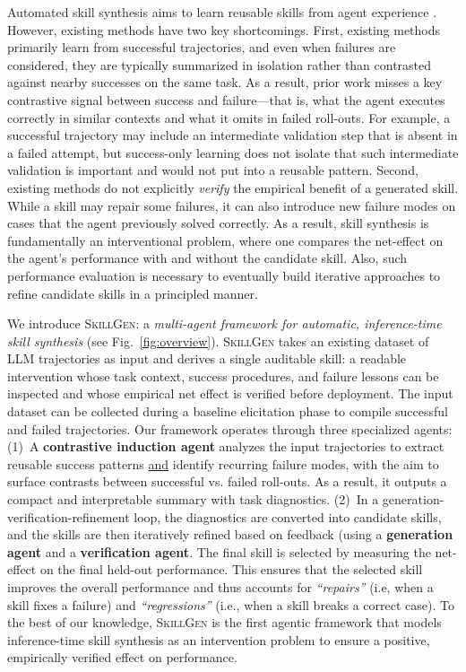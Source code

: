\documentclass{article}
\begin{document}
Automated skill synthesis aims to learn reusable skills from agent experience \citep{shinn2023reflexion,zhao2024expel,ni2026trace2skill,alzubi2026evoskill,wang2026skillx,zhang2026evoskills}. However, existing methods have two key {shortcomings}. First, existing methods primarily learn from successful trajectories, and even when failures are considered, they are typically summarized in isolation rather than contrasted against nearby successes on the same task. As a result, prior work misses a key contrastive signal between success and failure---that is, what the agent executes correctly in similar contexts and what it omits in failed roll-outs. For example, a successful trajectory may include an intermediate validation step that is absent in a failed attempt, but success-only learning does not isolate that such intermediate validation is important and would not put into a reusable pattern. Second, existing methods do not explicitly \emph{verify} the empirical benefit of a generated skill. While a skill may repair some failures, it can also introduce new failure modes on cases that the agent previously solved correctly. As a result, skill synthesis is fundamentally an interventional problem, where one compares the net-effect on the agent's performance with and without the candidate skill. Also, such performance evaluation is necessary to eventually build iterative approaches to refine candidate skills in a principled manner.




We introduce \textsc{SkillGen}: a \emph{multi-agent framework for automatic, inference-time skill synthesis} (see Fig.~\ref{fig:overview}). \textsc{SkillGen} takes an existing dataset of LLM trajectories as input and derives a single auditable skill: a readable intervention whose task context, success procedures, and failure lessons can be inspected and whose empirical net effect is verified before deployment. The input dataset can be collected during a baseline elicitation phase to compile successful and failed trajectories.  Our framework operates through three specialized agents: (1)~A \textbf{contrastive induction agent} analyzes the input trajectories to extract reusable success patterns \underline{and} identify recurring failure modes, with the aim to surface contrasts between successful vs. failed roll-outs. As a result, it outputs a compact and interpretable summary with task diagnostics. (2)~In a generation-verification-refinement loop, the diagnostics are converted into candidate skills, and the skills are then iteratively refined based on feedback (using a  \textbf{generation agent} and a \textbf{verification agent}. The final skill is selected by measuring the net-effect on the final held-out performance. This ensures that the selected skill improves the overall performance and thus accounts for \textit{``repairs''} (i.e, when a skill fixes a failure) and \textit{``regressions''} (i.e., when a skill breaks a correct case). To the best of our knowledge, \textsc{SkillGen} is the first agentic framework that models inference-time skill synthesis as an intervention problem to ensure a positive, empirically verified effect on performance.
\end{document}
